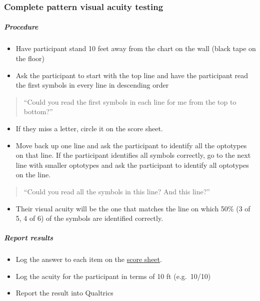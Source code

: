 \documentclass[]{article}
\providecommand{\tightlist}{%
  \setlength{\itemsep}{0pt}\setlength{\parskip}{0pt}}
\let\oldsubparagraph\subparagraph
\renewcommand{\subparagraph}[1]{\oldsubparagraph{#1}\mbox{}}
\begin{document}
\subsubsection{Complete pattern visual acuity
testing}\label{complete-pattern-visual-acuity-testing}

\subparagraph{Procedure}\label{procedure}

\begin{itemize}
\tightlist
\item
  Have participant stand 10 feet away from the chart on the wall (black
  tape on the floor)
\item
  Ask the participant to start with the top line and have the
  participant read the first symbols in every line in descending order
\end{itemize}

\begin{quote}
``Could you read the first symbols in each line for me from the top to
bottom?''
\end{quote}

\begin{itemize}
\tightlist
\item
  If they miss a letter, circle it on the score sheet.
\item
  Move back up one line and ask the participant to identify all the
  optotypes on that line. If the participant identifies all symbols
  correctly, go to the next line with smaller optotypes and ask the
  participant to identify all optotypes on the line.
\end{itemize}

\begin{quote}
``Could you read all the symbols in this line? And this line?''
\end{quote}

\begin{itemize}
\tightlist
\item
  Their visual acuity will be the one that matches the line on which
  50\% (3 of 5, 4 of 6) of the symbols are identified correctly.
\end{itemize}

\subparagraph{Report results}\label{report-results}

\begin{itemize}
\tightlist
\item
  Log the answer to each item on the
  \href{vision-screening-score-sheet.html}{score sheet}.
\item
  Log the acuity for the participant in terms of 10 ft (e.g.~10/10)
\item
  Report the result into Qualtrics
\end{itemize}
\end{document}
